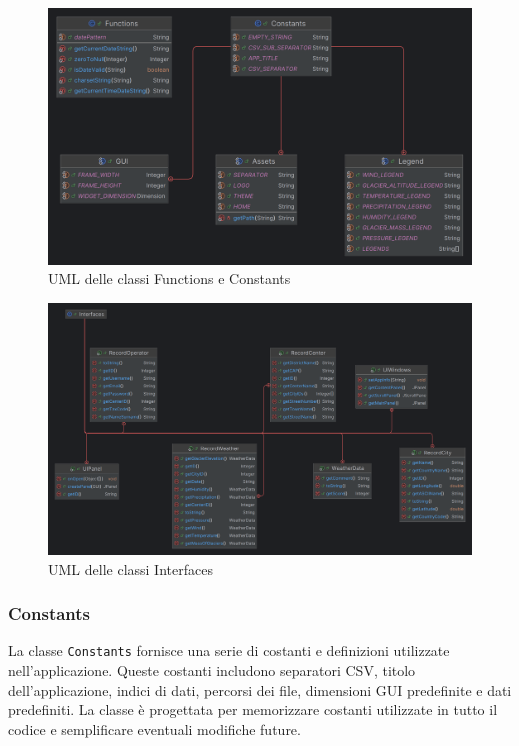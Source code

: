 \begin{figure}[H]
    \centering
    \includegraphics[scale = 0.2]{img/utils_1.png}
    \caption{UML delle classi Functions e Constants}
    \label{fig:Utils1}    
\end{figure}

\begin{figure}[H]
    \centering
    \includegraphics[scale = 0.1]{img/utils_2.png}
    \caption{UML delle classi Interfaces}
    \label{fig:Utils2}    
\end{figure}

\subsubsection{Constants}
La classe \texttt{Constants} fornisce una serie di costanti e definizioni utilizzate nell'applicazione.
Queste costanti includono separatori CSV, titolo dell'applicazione, indici di dati, percorsi dei file, dimensioni GUI predefinite e dati predefiniti.
La classe è progettata per memorizzare costanti utilizzate in tutto il codice e semplificare eventuali modifiche future.

